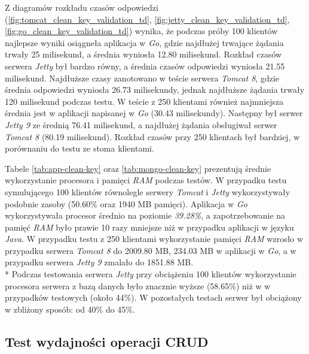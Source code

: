 Z diagramów rozkładu czasów odpowiedzi (\ref{fig:tomcat_clean_key_validation_td},  \ref{fig:jetty_clean_key_validation_td}, \ref{fig:go_clean_key_validation_td}) wynika, że podczas próby 100 klientów najlepsze wyniki osiągneła aplikacja w \textsl{Go}, gdzie najdłużej trwające żądania trwały 25 milisekund, a średnia wyniosła 12.80 milisekund. Rozkład czasów serwera \textsl{Jetty} był bardzo równy, a średnia czasów odpowiedzi wyniosła 21.55 milisekund. Najdłuższe czasy zanotowano w teście serwera \textsl{Tomcat 8}, gdzie średnia odpowiedzi wyniosła 26.73 milisekundy, jednak najdłuższe żądania trwały 120 milisekund podczas testu. W teście z 250 klientami również najmniejsza średnia jest w aplikacji napisanej w \textsl{Go} (30.43 milisekundy). Następny był serwer \textsl{Jetty 9} ze średnią 76.41 milisekund, a najdłużej żądania obsługiwał serwer \textsl{Tomcat 8} (80.19 milisekund). Rozkład czasów przy 250 klientach był bardziej, w porównaniu do testu ze stoma klientami.

Tabele \ref{tab:app-clean-key} oraz \ref{tab:mongo-clean-key} prezentują średnie wykorzystanie procesora i pamięci \textsl{RAM} podczas testów. W przypadku testu symulującego 100 klientów równolegle serwery \textsl{Tomcat} i \textsl{Jetty} wykorzystywały podobnie zasoby (50.60\% oraz 1940 MB pamięci). Aplikacja w \textsl{Go} wykorzystywała procesor średnio na poziomie \textsl{39.28\%}, a zapotrzebowanie na pamięć \textsl{RAM} było prawie 10 razy mniejsze niż w przypadku aplikacji w języku \textsl{Java}. W przypadku testu z 250 klientami wykorzystanie pamięci \textsl{RAM} wzrosło w przypadku serwera \textsl{Tomcat 8} do 2009.80 MB, 234.03 MB w aplikacji w \textsl{Go}, a w przypadku serwera \textsl{Jetty 9} zmalało do 1851.88 MB.\\*
Podczas testowania serwera \textsl{Jetty} przy obciążeniu 100 klientów wykorzystanie procesora serwera z bazą danych było znacznie wyższe (58.65\%) niż w w przypadków testowych (około 44\%).  W pozostałych testach serwer był obciążony w zbliżony sposób: od 40\% do 45\%.
 


\clearpage

\subsection{Test wydajności operacji CRUD}
% 
% 
\clearpage

